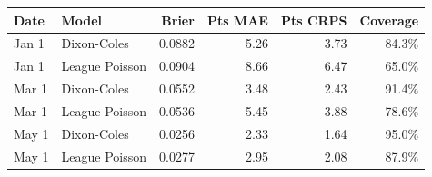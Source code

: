 \small
\begin{tabular}{llrrrr}
\toprule
Date & Model & Brier & Pts MAE & Pts CRPS & Coverage \\
\midrule
Jan 1 & Dixon-Coles & 0.0882 & 5.26 & 3.73 & 84.3\% \\
Jan 1 & League Poisson & 0.0904 & 8.66 & 6.47 & 65.0\% \\
Mar 1 & Dixon-Coles & 0.0552 & 3.48 & 2.43 & 91.4\% \\
Mar 1 & League Poisson & 0.0536 & 5.45 & 3.88 & 78.6\% \\
May 1 & Dixon-Coles & 0.0256 & 2.33 & 1.64 & 95.0\% \\
May 1 & League Poisson & 0.0277 & 2.95 & 2.08 & 87.9\% \\
\bottomrule
\end{tabular}

